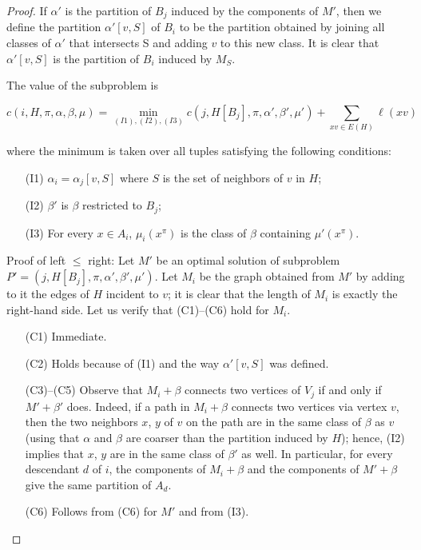 \begin{proof}
If \(\alpha'\) is the partition of \(B_j\) induced by the components of \(M'\), then we define the partition \(\alpha'[v, S]\) of \(B_i\) to be the partition obtained by joining all classes of \(\alpha'\) that intersects S and adding \(v\) to this new class. It is clear that \(\alpha'[v, S]\) is the partition of \(B_i\) induced by \(M_S\).

The value of the subproblem is

$$c(i, H, \pi, \alpha, \beta, \mu) = \min_{(I1), (I2), (I3)} c(j, H[B_j], \pi, \alpha', \beta', \mu') + \sum_{xv \in E(H)}\ell(xv)$$

where the minimum is taken over all tuples satisfying the following conditions:

\begin{itemize}
    \item[(I1)] \(\alpha_i = \alpha_j[v, S]\) where \(S\) is the set of neighbors of \(v\) in \(H\);
    \item[(I2)] \(\beta'\) is \(\beta\) restricted to \(B_j\);
    \item[(I3)] For every \(x \in A_i\), \(\mu_i(x^\pi)\) is the class of \(\beta\) containing \(\mu'(x^\pi)\).
\end{itemize}

Proof of left \(\leq\) right:
Let \(M'\) be an optimal solution of subproblem \(P' = (j , H[B_j], \pi, \alpha', \beta', \mu')\). Let \(M_i\) be the graph obtained from \(M'\) by adding to it the edges of \(H\) incident to \(v\); it is clear that the length of \(M_i\) is exactly the right-hand side. Let us verify that (C1)–(C6) hold for \(M_i\).

\begin{itemize}
    \item[(C1)] Immediate.
    \item[(C2)] Holds because of (I1) and the way \(\alpha'[v, S]\) was defined.
    \item[(C3)–(C5)] Observe that \(M_i + \beta\) connects two vertices of \(V_j\) if and only if \(M' + \beta'\) does. Indeed, if a path in \(M_i + \beta\) connects two vertices via vertex \(v\), then the two neighbors \(x\), \(y\) of \(v\) on the path are in the same class of \(\beta\) as \(v\) (using that \(\alpha\) and \(\beta\) are coarser than the partition induced by \(H\)); hence, (I2) implies that \(x\), \(y\) are in the same class of \(\beta'\) as well. In particular, for every descendant \(d\) of \(i\), the components of \(M_i + \beta\) and the components of \(M' + \beta\) give the same partition of \(A_d\).
    \item[(C6)] Follows from (C6) for \(M'\) and from (I3).
\end{itemize}


\end{proof}
